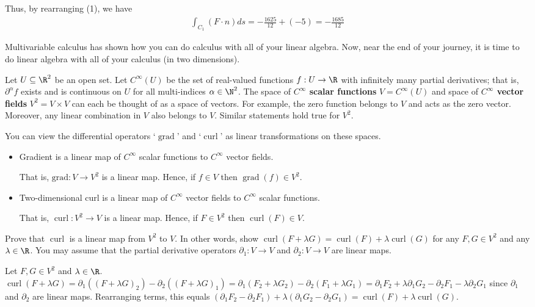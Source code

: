 \documentclass{exam}
\DeclareMathOperator{\Grad}{grad} %
\DeclareMathOperator{\Curl}{curl} %
\begin{document}
\begin{questions}
\begin{answer}{560pt}
Thus, by rearranging (1), we have \begin{align*}\int_{C_1}(F\cdot n)ds = -\frac{1625}{12}+(-5) = -\frac{1685}{12}\end{align*}
\end{answer}

\pagebreak
\question   \label{AllTheCalculus} Multivariable calculus has shown how you can do calculus with all of your linear algebra. Now, near the end of your journey, it is time to do linear algebra with all of your  calculus (in two dimensions). 

Let $U \subseteq \R^2$ be an open set.  Let $C^{\infty}(U)$ be the set of real-valued functions $f : U \to \R$  with infinitely many partial derivatives; that is, $\partial^{\alpha} f$ exists and is continuous on $U$ for all multi-indices $\alpha \in \N^2$. The space of \textbf{$C^{\infty}$ scalar functions} $V= C^{\infty}(U)$ and space of \textbf{$C^{\infty}$ vector fields} $V^2 = V \times V$ can each be thought of as a space of vectors.  For example, the zero function belongs to $V$  and acts  as the zero vector. Moreover, any linear combination in $V$ also belongs to $V$. Similar statements hold  true for $V^2$.   


\begin{parts}
	\item   You can view the differential operators `$\Grad$' and `$\Curl$' as linear transformations on these spaces. 
	\begin{itemize}
		\item Gradient is a linear map of $C^{\infty}$ scalar functions to $C^{\infty}$ vector fields. 
	
		That is, $\mathrm{grad} : V \to V^2$ is a linear map. Hence, if $f \in V$ then $\Grad(f) \in V^2$.	
	
		\item Two-dimensional curl is a linear map of $C^{\infty}$ vector fields to $C^{\infty}$ scalar functions. 
	
		That is, $\Curl : V^2 \to V$ is a linear map. Hence, if $F \in V^2$ then $\Curl(F) \in V$. 
	\end{itemize}
	Prove that  $\Curl$ is a linear map from $V^2$ to $V$. In other words, show $\Curl(F + \lambda G) = \Curl(F) + \lambda \Curl(G)$ for any $F, G \in V^2$ and any $\lambda \in \R$.  You may assume that the  partial derivative operators $\partial_1 : V \to V$ and $\partial_2 : V \to V$ are linear maps. 
	\begin{answer}{250pt}
Let $F, G \in V^2$ and $\lambda \in \R$. $\Curl(F + \lambda G) = \partial_1 ((F + \lambda G)_2) - \partial_2 ((F + \lambda G)_1) = \partial_1 (F_2 + \lambda G_2) - \partial_2 (F_1 + \lambda G_1) = \partial_1 F_2 + \lambda \partial_1 G_2 - \partial_2 F_1 - \lambda \partial_2 G_1$ since $\partial_1$ and $\partial_2$ are linear maps. Rearranging terms, this equals $(\partial_1 F_2 - \partial_2 F_1) + \lambda(\partial_1 G_2 - \partial_2 G_1) = \Curl(F) + \lambda\Curl(G)$.
	\end{answer}	
	

\end{parts}
\end{questions}
\end{document}
